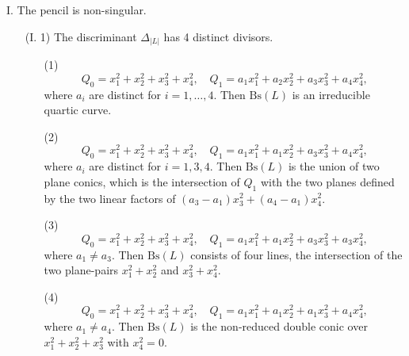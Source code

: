 \documentclass{amsart}[12pt]
\theoremstyle{definition}
\theoremstyle{remark}
\numberwithin{equation}{section}
\newcommand{\abs}[1]{\lvert#1\rvert}
\begin{document}
I. The pencil is non-singular.
\begin{itemize}
\item[(I. 1)] The discriminant $\Delta_{\abs{L}}$ has 4 distinct divisors. 
\begin{enumerate}
\item[(1)] 
\[
Q_0 = x_1^2 + x_2^2 + x_3^2 + x_4^2, \quad Q_1 = a_1x_1^2 + a_2x_2^2 + a_3x_3^2 + a_4x_4^2,
\]
where $a_i$ are distinct for $i = 1, \dots, 4$. Then $\mathrm{Bs}(L)$ is an irreducible quartic curve.
\item[(2)]
\[
Q_0 = x_1^2 + x_2^2 + x_3^2 + x_4^2, \quad Q_1 = a_1x_1^2 + a_1x_2^2 + a_3x_3^2 + a_4x_4^2,
\]
where $a_i$ are distinct for $i = 1, 3, 4$. Then $\mathrm{Bs}(L)$ is the union of two plane conics, which is the intersection of $Q_1$ with the two planes defined by the two linear factors of $(a_3 - a_1)x_3^2 + (a_4 - a_1)x_4^2$.
\item[(3)]
\[
Q_0 = x_1^2 + x_2^2 + x_3^2 + x_4^2, \quad Q_1 = a_1x_1^2 + a_1x_2^2 + a_3x_3^2 + a_3x_4^2,
\]
where $a_1 \neq a_3$. Then $\mathrm{Bs}(L)$ consists of four lines, the intersection of the two plane-pairs $x_1^2 + x_2^2$ and $x_3^2 + x_4^2$.
\item[(4)]
\[
Q_0 = x_1^2 + x_2^2 + x_3^2 + x_4^2, \quad Q_1 = a_1x_1^2 + a_1x_2^2 + a_1x_3^2 + a_4x_4^2,
\]
where $a_1 \neq a_4$. Then $\mathrm{Bs}(L)$ is the non-reduced double conic over $x_1^2 + x_2^2 + x_3^2$ with $x_4^2 = 0$.
\end{enumerate}


\end{itemize}
\end{document}
